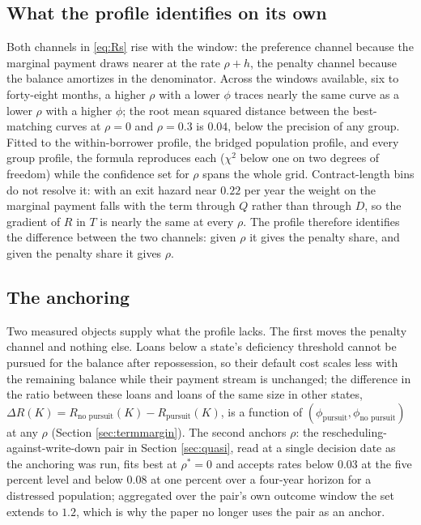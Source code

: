 \subsection{What the profile identifies on its own}
Both channels in \eqref{eq:Rs} rise with the window: the preference channel because the marginal payment draws nearer at the rate $\rho + h$, the penalty channel because the balance amortizes in the denominator. Across the windows available, six to forty-eight months, a higher $\rho$ with a lower $\phi$ traces nearly the same curve as a lower $\rho$ with a higher $\phi$; the root mean squared distance between the best-matching curves at $\rho = 0$ and $\rho = 0.3$ is $0.04$, below the precision of any group. Fitted to the within-borrower profile, the bridged population profile, and every group profile, the formula reproduces each ($\chi^2$ below one on two degrees of freedom) while the confidence set for $\rho$ spans the whole grid. Contract-length bins do not resolve it: with an exit hazard near $0.22$ per year the weight on the marginal payment falls with the term through $Q$ rather than through $D$, so the gradient of $R$ in $T$ is nearly the same at every $\rho$. The profile therefore identifies the difference between the two channels: given $\rho$ it gives the penalty share, and given the penalty share it gives $\rho$.

\subsection{The anchoring}
Two measured objects supply what the profile lacks. The first moves the penalty channel and nothing else. Loans below a state's deficiency threshold cannot be pursued for the balance after repossession, so their default cost scales less with the remaining balance while their payment stream is unchanged; the difference in the ratio between these loans and loans of the same size in other states, $\Delta R(K) = R_{\text{no pursuit}}(K) - R_{\text{pursuit}}(K)$, is a function of $(\phi_{\text{pursuit}}, \phi_{\text{no pursuit}})$ at any $\rho$ (Section \ref{sec:termmargin}). The second anchors $\rho$: the rescheduling-against-write-down pair in Section \ref{sec:quasi}, read at a single decision date as the anchoring was run, fits best at $\rho^\ast = 0$ and accepts rates below $0.03$ at the five percent level and below $0.08$ at one percent over a four-year horizon for a distressed population; aggregated over the pair's own outcome window the set extends to $1.2$, which is why the paper no longer uses the pair as an anchor.

